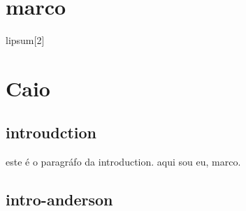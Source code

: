 
    \section{marco}
    lipsum[2]
    \section{Caio}


    \subsection{introudction}
    este é o paragráfo da introduction.
    aqui sou eu, marco.

    \subsection{intro-anderson}

    
    




